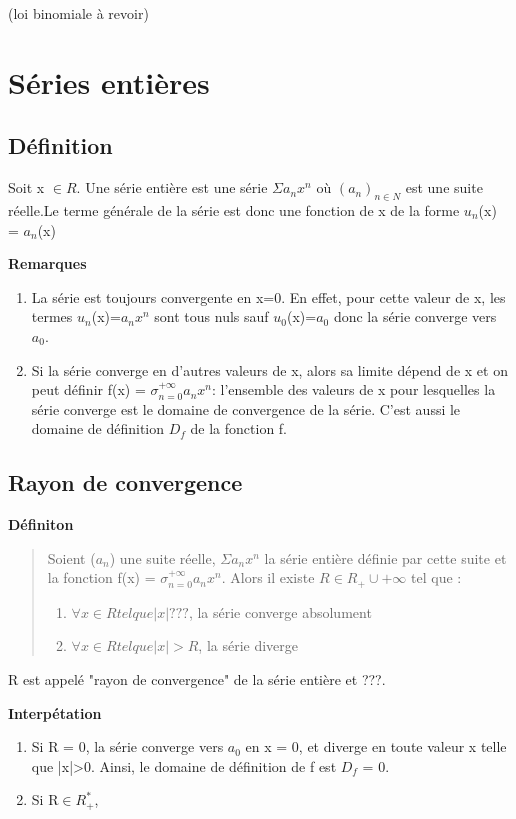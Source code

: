 \documentclass{article}
\begin{document}
(loi binomiale à revoir)

\section{Séries entières}
\subsection{Définition}
Soit x $\in R$. Une série entière est une série $\Sigma a_{n} x^{n}$ où $(a_{n})_{n \in N}$ est une suite réelle.Le terme générale de la série est donc une fonction de x de la forme $u_{n}$(x) = $a_{n}$(x)

\textbf{Remarques}
\begin{enumerate}
    \item La série est toujours convergente en x=0. En effet, pour cette valeur de x, les termes $u_{n}$(x)=$a_{n}x^{n}$ sont tous nuls sauf $u_{0}$(x)=$a_{0}$ donc la série converge vers $a_{0}$.
    \item Si la série converge en d'autres valeurs de x, alors sa limite dépend de x et on peut définir f(x) = $\sigma_{n=0}^{+\infty}a_{n}x^{n}$: l'ensemble des valeurs de x pour lesquelles la série converge est le domaine de convergence de la série. C'est aussi le domaine de définition $D_{f}$ de la fonction f.
\end{enumerate}

\subsection{Rayon de convergence}
\textbf{Définiton}
\begin{quote}
    Soient ($a_{n}$) une suite réelle, $\Sigma a_{n}x^{n}$ la série entière définie par cette suite et la fonction f(x) = $\sigma_{n=0}^{+\infty}a_{n}x^{n}$.\newline
    Alors il existe $R \in R_{+} \cup {+\infty}$ tel que :
    \begin{enumerate}
        \item $\forall x \in R tel que |x| ???$, la série converge absolument
        \item $\forall x \in R tel que |x| > R$, la série diverge
    \end{enumerate}
\end{quote}
\noindent R est appelé "rayon de convergence" de la série entière et ???.

\noindent \textbf{Interpétation}
\begin{enumerate}
    \item Si R = 0, la série converge vers $a_{0}$ en x = 0, et diverge en toute valeur x telle que |x|>0. Ainsi, le domaine de définition de f est $D_{f}$ = {0}.
    \item Si R$\in R_{+}^{*}$, 
\end{enumerate}
\end{document}
